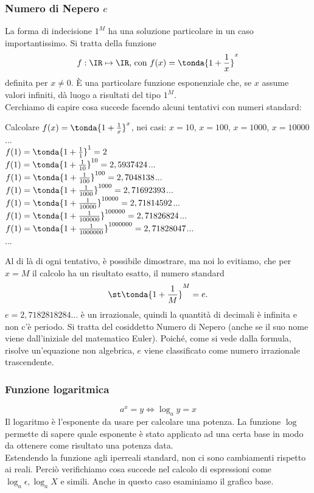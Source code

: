 \subsubsection{Numero di Nepero $e$}
\label{subsubsec:insnum_nepero}
La forma di indecisione $1^M$ ha una soluzione particolare in un caso 
importantissimo. Si tratta della funzione
\[
 f:\IR\mapsto \IR \text{, con } f(x)= \tonda{1+\frac{1}{x}}^x
\]
definita per $x\ne 0$. È una particolare funzione esponenziale che,
se $x$ assume valori infiniti, dà luogo a risultati del tipo $1^M$.\\
Cerchiamo di capire cosa succede facendo alcuni tentativi con numeri standard:
\begin{esempio}
 Calcolare $f(x)= \tonda{1+\frac{1}{x}}^x$, nei casi: $x=10$, $x=100$, 
 $x=1000$, $x=10000$...\\
 $f(1)=\tonda{1+\frac{1}{1}}^1=2$\\
 $f(1)=\tonda{1+\frac{1}{10}}^{10}=2,5937424$...\\
 $f(1)=\tonda{1+\frac{1}{100}}^{100}=2,7048138$...\\
 $f(1)=\tonda{1+\frac{1}{1000}}^{1000}=2,71692393$...\\
 $f(1)=\tonda{1+\frac{1}{10000}}^{10000}=2,71814592$...\\
 $f(1)=\tonda{1+\frac{1}{100000}}^{100000}=2,71826824$...\\
 $f(1)=\tonda{1+\frac{1}{1000000}}^{1000000}=2,71828047$...\\
 ...
\end{esempio}

Al di là di ogni tentativo, è possibile dimostrare, ma noi lo evitiamo, 
che per $x=M$ il calcolo ha un risultato esatto, il numero standard
\[
 \st\tonda{1+\frac{1}{M}}^M=e.
\]
$e=2,7182818284...$ è un irrazionale, quindi la quantità 
di decimali è infinita e non c'è periodo. 
Si tratta del cosiddetto Numero di Nepero (anche se il suo nome viene dall'iniziale 
del matematico Euler). Poiché, come si vede dalla formula, risolve un'equazione
non algebrica, $e$ viene classificato come numero irrazionale trascendente.

\subsubsection{Funzione logaritmica}
\label{subsubsec:insnum_log}
\[
 a^x=y \Leftrightarrow \log_a{y}=x
\]
Il logaritmo è l'esponente da usare per calcolare una potenza.
La funzione \(\log\) permette di sapere quale esponente è stato applicato
ad una certa base in modo da ottenere come risultato una potenza data.\\
Estendendo la funzione agli iperreali standard, non ci sono cambiamenti rispetto 
ai reali. Perciò verifichiamo cosa succede nel calcolo di espressioni come
$\log_a \epsilon, \log_a X$ e simili. Anche in questo caso esaminiamo il
grafico base.

